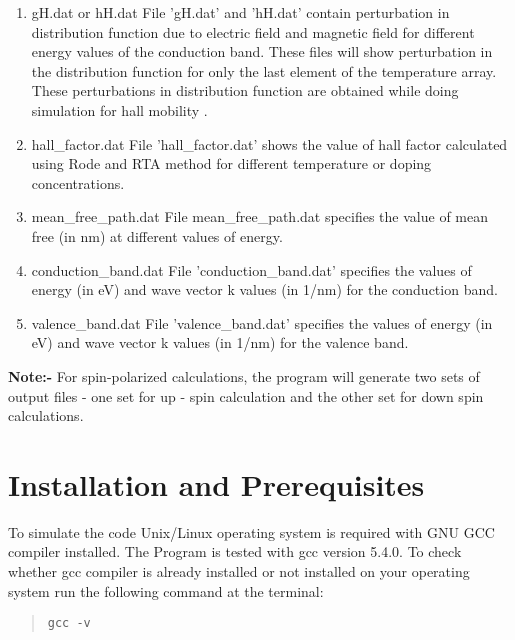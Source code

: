 \documentclass[12pt]{article}
\begin{document}
\begin{enumerate}
\item gH.dat or hH.dat
\newline File 'gH.dat' and 'hH.dat' contain perturbation in distribution function due to electric field and magnetic field for different energy values of the conduction band. These files will show perturbation in the distribution function for only the last element of the temperature array. These perturbations in distribution function are obtained while doing simulation for hall mobility \cite{rode4}.

\item hall\_factor.dat
\newline File 'hall\_factor.dat' shows the value of hall factor calculated using Rode and RTA method for different temperature or doping concentrations.

\item mean\_free\_path.dat
\newline File mean\_free\_path.dat specifies the value of mean free (in nm) at different values of energy.

\item conduction\_band.dat
\newline File 'conduction\_band.dat' specifies the values of energy (in eV) and wave vector k values (in 1/nm) for the conduction band.

\item valence\_band.dat
\newline File 'valence\_band.dat' specifies the values of energy (in eV) and wave vector k values (in 1/nm) for the valence band. 

\end{enumerate}

\textbf{Note:-} For spin-polarized calculations, the program will generate two sets of output files - one set for up - spin calculation and the other set for down spin calculations. 
  
  
\section{Installation and Prerequisites}
To simulate the code Unix/Linux operating system is required with GNU GCC compiler installed. The Program is tested with gcc version 5.4.0.
\newline To check whether gcc compiler is already installed or not installed on your operating system run the following command at the terminal:

\begin{quote}
\begin{verbatim}
gcc -v
\end{verbatim}
\end{quote}
\end{document}
